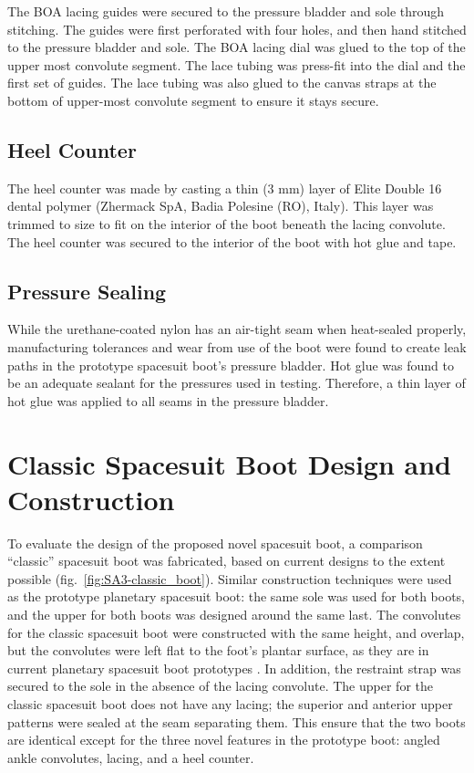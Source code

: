 \documentclass[defaultstyle,11pt]{thesis}
\begin{document}
The BOA lacing guides were secured to the pressure bladder and sole through stitching.
The guides were first perforated with four holes, and then hand stitched to the pressure bladder and sole.
The BOA lacing dial was glued to the top of the upper most convolute segment.
The lace tubing was press-fit into the dial and the first set of guides.
The lace tubing was also glued to the canvas straps at the bottom of upper-most convolute segment to ensure it stays secure.

\hypertarget{heel-counter-1}{%
\subsection{Heel Counter}\label{heel-counter-1}}

The heel counter was made by casting a thin (3 mm) layer of Elite Double 16 dental polymer (Zhermack SpA, Badia Polesine (RO), Italy).
This layer was trimmed to size to fit on the interior of the boot beneath the lacing convolute.
The heel counter was secured to the interior of the boot with hot glue and tape.

\hypertarget{pressure-sealing}{%
\subsection{Pressure Sealing}\label{pressure-sealing}}

While the urethane-coated nylon has an air-tight seam when heat-sealed properly, manufacturing tolerances and wear from use of the boot were found to create leak paths in the prototype spacesuit boot's pressure bladder.
Hot glue was found to be an adequate sealant for the pressures used in testing.
Therefore, a thin layer of hot glue was applied to all seams in the pressure bladder.

\hypertarget{classic-spacesuit-boot-design-and-construction}{%
\section{Classic Spacesuit Boot Design and Construction}\label{classic-spacesuit-boot-design-and-construction}}

To evaluate the design of the proposed novel spacesuit boot, a comparison ``classic'' spacesuit boot was fabricated, based on current designs to the extent possible (fig.~\ref{fig:SA3-classic_boot}).
Similar construction techniques were used as the prototype planetary spacesuit boot: the same sole was used for both boots, and the upper for both boots was designed around the same last.
The convolutes for the classic spacesuit boot were constructed with the same height, and overlap, but the convolutes were left flat to the foot's plantar surface, as they are in current planetary spacesuit boot prototypes \citep{Ross2002}.
In addition, the restraint strap was secured to the sole in the absence of the lacing convolute.
The upper for the classic spacesuit boot does not have any lacing; the superior and anterior upper patterns were sealed at the seam separating them.
This ensure that the two boots are identical except for the three novel features in the prototype boot: angled ankle convolutes, lacing, and a heel counter.
\end{document}
